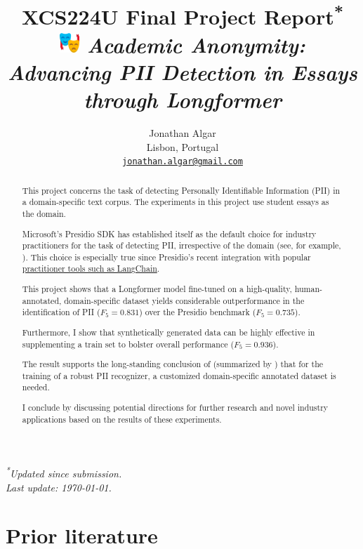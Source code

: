 \documentclass[11pt]{article}
\title{%
  XCS224U Final Project Report\textsuperscript{*} \\
  \includegraphics[height=1em]{images/emoji.png}%
  \hspace{0.1em} \textit{Academic Anonymity: Advancing PII Detection in Essays through Longformer}%
}
\author{Jonathan Algar \\
  Lisbon, Portugal \\
  \texttt{\href{mailto:jonathan.algar@gmail.com}{jonathan.algar@gmail.com}}
}
\begin{document}
\maketitle
\vspace{-1em}
\begin{center}
\small\textit{\textsuperscript{*}{Updated since submission. \\ Last update: \today}.}
\end{center}

\begin{abstract}

This project concerns the task of detecting Personally Identifiable Information (PII) in a domain-specific text corpus. The experiments in this project use student essays as the domain.

Microsoft's Presidio SDK \cite{Presidio} has established itself as the default choice for industry practitioners for the task of detecting PII, irrespective of the domain (see, for example, \citealt{AzizStraiton2023PIIDetection}). This choice is especially true since Presidio's recent integration with popular \href{https://python.langchain.com/docs/guides/productionization/safety/presidio_data_anonymization/}{practitioner tools such as LangChain}.

This project shows that a Longformer model \cite{abs-2004-05150} fine-tuned on a high-quality, human-annotated, domain-specific dataset yields considerable outperformance in the identification of PII ($F_5 = 0.831$) over the Presidio benchmark ($F_5 = 0.735$).

Furthermore, I show that synthetically generated data can be highly effective in supplementing a train set to bolster overall performance ($F_5 = 0.936$).

The result supports the long-standing conclusion of \citealt{Chen2015ASO} (summarized by \citealt{hathurusinghe-etal-2021-privacy}) that for the training of a robust PII recognizer, a customized domain-specific annotated dataset is needed.

I conclude by discussing potential directions for further research and novel industry applications based on the results of these experiments.

\end{abstract}

\section{Prior literature}
\end{document}
